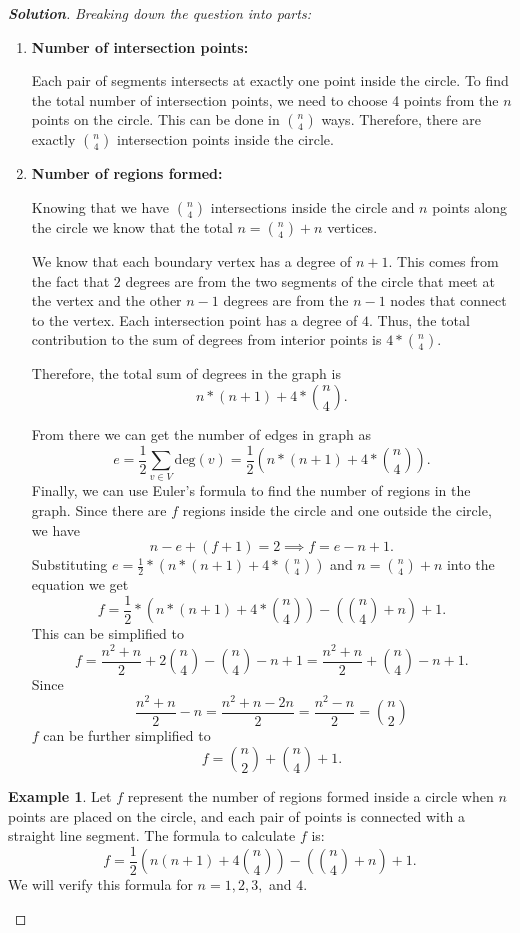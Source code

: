 \documentclass[12pt]{article}
\theoremstyle{definition}
\newtheorem{example}{Example}
\newenvironment{solution}
  {\begin{mdframed}[linewidth=0.5pt, roundcorner=10pt, linecolor=black]\begin{proof}[\bfseries Solution]}
  {\qedhere\end{proof}\end{mdframed}}
\begin{document}
\begin{solution} {\emph{Breaking down the question into parts:}}
\begin{enumerate}
    \item \textbf{Number of intersection points:}
    
    Each pair of segments intersects at exactly one point inside the circle. 
    To find the total number of intersection points, we need to choose 4 points from the \( n \) points on the circle. 
    This can be done in \( \binom{n}{4} \) ways. Therefore, there are exactly \( \binom{n}{4} \) intersection points inside the circle.
    
    \item \textbf{Number of regions formed:}
    
    Knowing that we have $\binom{n}{4}$ intersections inside the circle and $n$ points along the circle we know that the total $n = \binom{n}{4} + n$ vertices.
    
    We know that each boundary vertex has a degree of $n+1$. This comes from the fact that $2$ degrees are from the two segments of the circle that meet at the vertex and the other $n-1$ degrees are from the $n-1$ nodes that connect to the vertex.
    Each intersection point has a degree of $4$. Thus, the total contribution to the sum of degrees from interior points is $4*\binom{n}{4}$.
    
    Therefore, the total sum of degrees in the graph is 
    \[
    n*(n+1) + 4*\binom{n}{4}.
    \]

    From there we can get the number of edges in graph as 
    \[
    e = \frac{1}{2} \sum_{v \in V} \text{deg}(v) = \frac{1}{2}(n*(n+1) + 4*\binom{n}{4}).
    \]
    Finally, we can use Euler's formula to find the number of regions in the graph.
    Since there are $f$ regions inside the circle and one outside the circle, we have
    \[
    n - e + (f + 1) = 2 \implies f = e - n + 1.
    \]
    Substituting $e = \frac{1}{2}*(n*(n+1) + 4*\binom{n}{4})$ and $n = \binom{n}{4} + n$ into the equation we get
    \[
    f = \frac{1}{2}*(n*(n+1) + 4*\binom{n}{4}) - (\binom{n}{4} + n) + 1.
    \]
    This can be simplified to
    \[
    f = \frac{n^2+n}{2} + 2\binom{n}{4} - \binom{n}{4} - n + 1 = \frac{n^2+n}{2} + \binom{n}{4} - n + 1.
    \]
    Since 
    \[
    \frac{n^2+n}{2} - n = \frac{n^2+n-2n}{2} = \frac{n^2-n}{2} = \binom{n}{2}
    \]
    $f$ can be further simplified to
    \[
    f = \binom{n}{2} + \binom{n}{4} + 1.
    \]
  \end{enumerate}
    \begin{example}
      Let \( f \) represent the number of regions formed inside a circle when \( n \) points are placed on the circle, and each pair of points is connected with a straight line segment. The formula to calculate \( f \) is:
      \[
          f = \frac{1}{2} \left( n(n+1) + 4 \binom{n}{4} \right) - \left( \binom{n}{4} + n \right) + 1.
      \]
      We will verify this formula for \( n = 1, 2, 3, \) and \( 4 \).
      

\end{example}
\end{solution}
\end{document}
